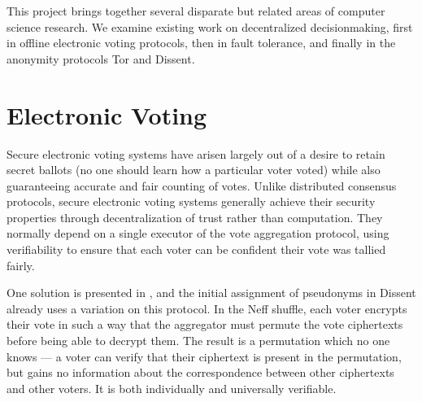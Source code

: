 %
%
%
This project brings together several disparate but related areas of computer
science research. We examine existing work on decentralized decisionmaking,
first in offline electronic voting protocols, then in fault tolerance, and
finally in the anonymity protocols Tor and Dissent.
  \section{Electronic Voting} \label{Section:evoting}
    Secure electronic voting systems have arisen largely out of a desire to
    retain secret ballots (no one should learn how a particular voter voted)
    while also guaranteeing accurate and fair counting of votes. Unlike
    distributed consensus protocols, secure electronic voting systems generally
    achieve their security properties through decentralization of trust rather
    than computation. They normally depend on a single executor of the vote
    aggregation protocol, using verifiability to ensure that each voter can be
    confident their vote was tallied fairly.

    One solution is presented in \cite{neff}, and the initial assignment of
    pseudonyms in Dissent already uses a variation on this protocol. In the Neff
    shuffle, each voter encrypts their vote in such a way that the aggregator
    must permute the vote ciphertexts before being able to decrypt them. The
    result is a permutation which no one knows --- a voter can verify that their
    ciphertext is present in the permutation, but gains no information about the
    correspondence between other ciphertexts and other voters. It is both
    individually and universally verifiable.

